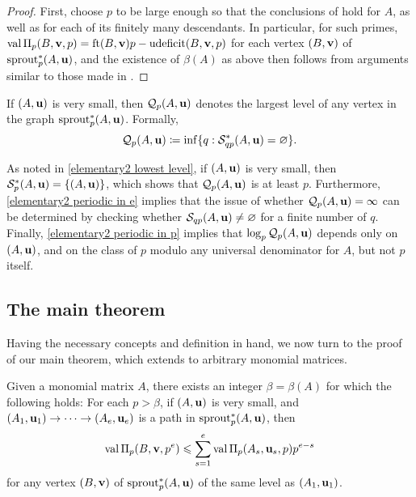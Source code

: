 \documentclass{amsart}
\begin{document}
\begin{proof}
   First, choose $p$ to be large enough so that the conclusions of  hold for $A$, as well as for each of its finitely many descendants.
   In particular, for such primes, $\operatorname{val} \Pi_p(B,\mathbf{v},p) = \operatorname{ft}(B, \mathbf{v})p-\operatorname{udeficit}(B,\mathbf{v},p)$  for each vertex $(B,\mathbf{v})$ of $\operatorname{sprout}_p^{\ast}(A,\mathbf{u})$, and the existence of $\beta(A)$ as above then follows from arguments similar to those made in .
\end{proof}

\begin{definition}
   If $(A,\mathbf{u})$ is very small, then $\mathcal{Q}_p(A,\mathbf{u})$ denotes the largest level of any vertex in the graph $\operatorname{sprout}_p^{\ast}(A,\mathbf{u})$.
   Formally,
   \[
      \mathcal{Q}_p(A,\mathbf{u}) \coloneqq \inf \{ q :  \mathcal{S}^{\ast}_{qp}(A,\mathbf{u}) = \varnothing \}.
   \]
\end{definition}

\begin{remark}
   As noted in \eqref{elementary2 lowest level}, if $(A,\mathbf{u})$ is very small, then $\mathcal{S}^{\ast}_p(A,\mathbf{u}) = \{ (A,\mathbf{u} )\}$, which shows that $\mathcal{Q}_p(A,\mathbf{u})$ is at least $p$.
   Furthermore, \eqref{elementary2 periodic in e}  implies that the issue of whether $\mathcal{Q}_p(A,\mathbf{u}) = \infty$ can be determined by checking whether $\mathcal{S}_{qp}(A,\mathbf{u}) \neq \varnothing$ for a finite number of $q$.
   Finally, \eqref{elementary2 periodic in p} implies that $\log_p \mathcal{Q}_p(A,\mathbf{u})$ depends only on $(A,\mathbf{u})$, and on the class of $p$ modulo any universal denominator for $A$, but not $p$ itself.
\end{remark}

\subsection{The main theorem}

Having the necessary concepts and definition in hand, we now turn to the proof of our main theorem, which extends  to arbitrary monomial matrices.

\begin{lemma}\label{lem: upper bound for higher mu}
   Given a monomial matrix $A$, there exists an integer $\beta= \beta(A)$ for which the following holds\textup:
   For each $p>\beta$, if $(A, \mathbf{u})$ is very small, and $(A_1, \mathbf{u}_1) \to \cdots \to (A_e, \mathbf{u}_e)$ is a path in $\operatorname{sprout}^{\ast}_p(A,\mathbf{u})$,  then
   \[
      \operatorname{val} \Pi_p(B, \mathbf{v}, p^e) \leqslant \sum_{s=1}^e \operatorname{val} \Pi_p(A_s, \mathbf{u}_s, p)p^{e-s}
   \]
   for any vertex $(B, \mathbf{v})$ of $\operatorname{sprout}^{\ast}_p(A,\mathbf{u})$ of the same level as $(A_1, \mathbf{u}_1)$.
\end{lemma}
\end{document}
